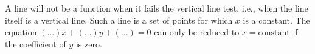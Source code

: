A line will not be a function when it fails the vertical line test, i.e.,
when the line itself is a vertical line. Such a line is a set of points
for which $x$ is a constant. The equation $(\ldots)x+(\ldots)y+(\ldots)=0$
can only be reduced to $x=\text{constant}$ if the coefficient of $y$
is zero.
